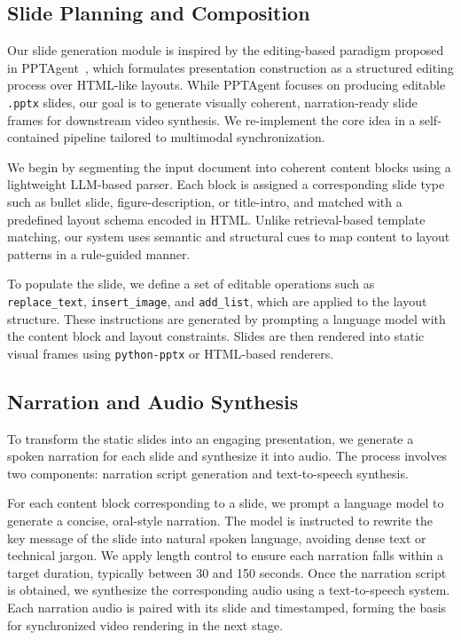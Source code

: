 \documentclass[11pt]{article}
\begin{document}
\subsection{Slide Planning and Composition}
 

Our slide generation module is inspired by the editing-based paradigm proposed in PPTAgent~\cite{zheng2025pptagent}, which formulates presentation construction as a structured editing process over HTML-like layouts. While PPTAgent focuses on producing editable \texttt{.pptx} slides, our goal is to generate visually coherent, narration-ready slide frames for downstream video synthesis. We re-implement the core idea in a self-contained pipeline tailored to multimodal synchronization.

We begin by segmenting the input document into coherent content blocks using a lightweight LLM-based parser. Each block is assigned a corresponding slide type such as bullet slide, figure-description, or title-intro, and matched with a predefined layout schema encoded in HTML. Unlike retrieval-based template matching, our system uses semantic and structural cues to map content to layout patterns in a rule-guided manner.

To populate the slide, we define a set of editable operations such as \texttt{replace\_text}, \texttt{insert\_image}, and \texttt{add\_list}, which are applied to the layout structure. These instructions are generated by prompting a language model with the content block and layout constraints. Slides are then rendered into static visual frames using \texttt{python-pptx} or HTML-based renderers.












\subsection{Narration and Audio Synthesis}

To transform the static slides into an engaging presentation, we generate a spoken narration for each slide and synthesize it into audio. The process involves two components: narration script generation and text-to-speech synthesis.

For each content block corresponding to a slide, we prompt a language model to generate a concise, oral-style narration. The model is instructed to rewrite the key message of the slide into natural spoken language, avoiding dense text or technical jargon. We apply length control to ensure each narration falls within a target duration, typically between 30 and 150 seconds. Once the narration script is obtained, we synthesize the corresponding audio using a text-to-speech system. Each narration audio is paired with its slide and timestamped, forming the basis for synchronized video rendering in the next stage.
\end{document}
